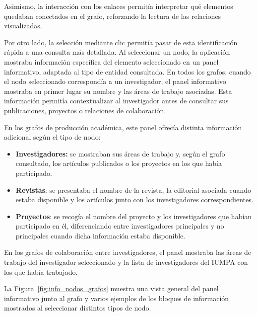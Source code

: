 \documentclass[11pt,spanish,listoffigures,listoftables]{tfgetsinf}
\begin{document}
Asimismo, la interacción con los enlaces permitía interpretar qué elementos quedaban conectados en el grafo, reforzando la lectura de las relaciones visualizadas.

Por otro lado, la selección mediante clic permitía pasar de esta identificación rápida a una consulta más detallada. Al seleccionar un nodo, la aplicación mostraba información específica del elemento seleccionado en un panel informativo, adaptada al tipo de entidad consultada. En todos los grafos, cuando el nodo seleccionado correspondía a un investigador, el panel informativo mostraba en primer lugar su nombre y las áreas de trabajo asociadas. Esta información permitía contextualizar al investigador antes de consultar sus publicaciones, proyectos o relaciones de colaboración.

En los grafos de producción académica, este panel ofrecía distinta información adicional según el tipo de nodo:

\begin{itemize}
    \item \textbf{Investigadores:} se mostraban sus áreas de trabajo y, según el grafo consultado, los artículos publicados o los proyectos en los que había participado.

    \item \textbf{Revistas}: se presentaba el nombre de la revista, la editorial asociada cuando estaba disponible y los artículos junto con los investigadores correspondientes.

    \item \textbf{Proyectos}: se recogía el nombre del proyecto y los investigadores que habían participado en él, diferenciando entre investigadores principales y no principales cuando dicha información estaba disponible.
\end{itemize}

En los grafos de colaboración entre investigadores, el panel mostraba las áreas de trabajo del investigador seleccionado y la lista de investigadores del IUMPA con los que había trabajado. 

La Figura~\ref{fig:info_nodos_grafos} muestra una vista general del panel informativo junto al grafo y varios ejemplos de los bloques de información mostrados al seleccionar distintos tipos de nodo.
\end{document}
